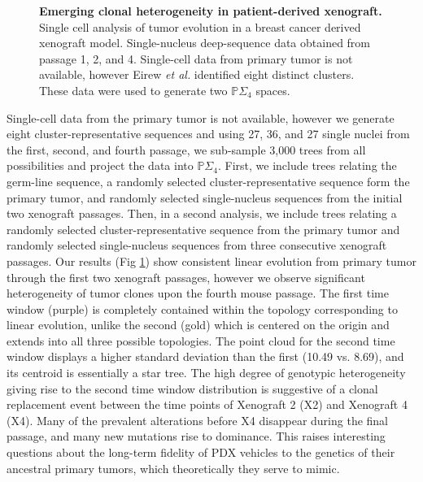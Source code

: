 \documentclass[a4paper,11pt]{article}
\begin{document}
\begin{figure}
    \caption{{\bf Emerging clonal heterogeneity in patient-derived xenograft.} Single cell analysis of tumor evolution in a breast cancer derived xenograft model. Single-nucleus deep-sequence data obtained from passage 1, 2, and 4. Single-cell data from primary tumor is not available, however Eirew \textit{et al.} identified eight distinct clusters. These data were used to generate two $\mathbb{P}\Sigma_4 $ spaces.}
    \label{fig:xenograft}
\end{figure} 

Single-cell data from the primary tumor is not available, however we generate eight cluster-representative sequences and using 27, 36, and 27 single nuclei from the first, second, and fourth passage, we sub-sample 3,000 trees from all possibilities and project the data into $\mathbb{P}\Sigma_4 $.
First, we include trees relating the germ-line sequence, a randomly selected cluster-representative sequence form the primary tumor, and randomly selected single-nucleus sequences from the initial two xenograft passages.
Then, in a second analysis, we include trees relating a randomly selected cluster-representative sequence from the primary tumor and randomly selected single-nucleus sequences from three consecutive xenograft passages.
Our results (Fig \ref{fig:xenograft}) show consistent linear evolution from primary tumor through the first two xenograft passages, however we observe significant heterogeneity of tumor clones upon the fourth mouse passage.
The first time window (purple) is completely contained within the topology corresponding to linear evolution, unlike the second (gold) which is centered on the origin and extends into all three possible topologies.
The point cloud for the second time window displays a higher standard deviation than the first (10.49 vs. 8.69), and its centroid is essentially a star tree.
The high degree of genotypic heterogeneity giving rise to the second time window distribution is suggestive of a clonal replacement event between the time points of Xenograft 2 (X2) and Xenograft 4 (X4).
Many of the prevalent alterations before X4 disappear during the final passage, and many new mutations rise to dominance.
This raises interesting questions about the long-term fidelity of PDX vehicles to the genetics of their ancestral primary tumors, which theoretically they serve to mimic.

\end{document}
